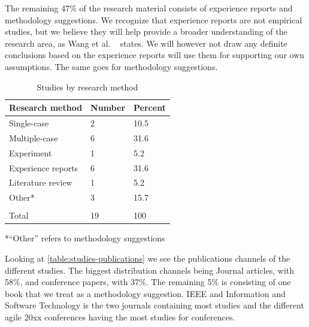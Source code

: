 \documentclass[12pt]{article}
\begin{document}
The remaining 47\% of the research material consists of experience reports and methodology suggestions. We recognize that experience reports are not empirical studies, but we believe they will help provide a broader understanding of the research area, as Wang et al. ~\cite{Wang2012} states. We will however not draw any definite conclusions based on the experience reports will use them for supporting our own assumptions. The same goes for methodology suggestions. 

\begin{table}[!h]
	\centering
	\caption{Studies by research method}
	\label{table:studies-research-methods}
	\begin{tabular}{ p{} p{} p{}}
		\hline
		Research method & Number & Percent \\ \hline
		Single-case & 2 & 10.5 \\
		Multiple-case & 6 & 31.6 \\
		Experiment & 1 & 5.2 \\
		Experience reports & 6 & 31.6 \\
		Literature review & 1 & 5.2 \\
		Other* & 3 & 15.7 \\
		\\
		Total & 19 & 100 \\ \hline
	\end{tabular}
	*``Other'' refers to methodology suggestions
\end{table}

Looking at \autoref{table:studies-publications} we see the publications channels of the different studies. The biggest distribution channels being Journal articles, with 58\%, and conference papers, with 37\%. The remaining 5\% is consisting of one book that we treat as a methodology suggestion. IEEE and Information and Software Technology is the two journals containing most studies and the different agile 20xx conferences having the most studies for conferences. 
\end{document}
